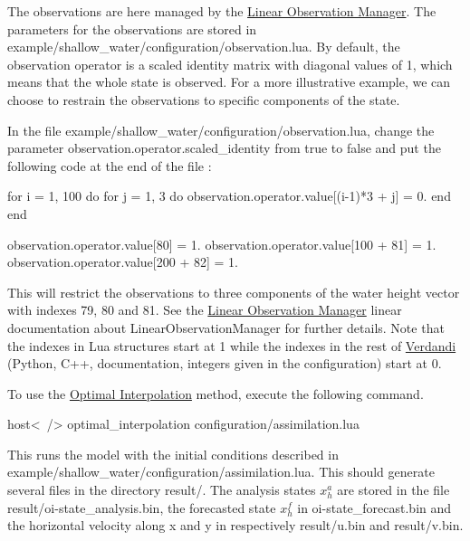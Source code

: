\documentclass{tufte-book}
\begin{document}
\-The observations are here managed by the \hyperlink{linear_observation_manager}{Linear Observation Manager}. \-The parameters for the observations are stored in {\ttfamily example/shallow\-\_\-water/configuration/observation.\-lua}. \-By default, the observation operator is a scaled identity matrix with diagonal values of 1, which means that the whole state is observed. \-For a more illustrative example, we can choose to restrain the observations to specific components of the state.

\-In the file {\ttfamily example/shallow\-\_\-water/configuration/observation.\-lua}, change the parameter {\ttfamily observation.\-operator.\-scaled\-\_\-identity} from {\ttfamily true} to {\ttfamily false} and put the following code at the end of the file \-:
\begin{frame_lua}
for i = 1, 100 do
   for j = 1, 3 do
      observation.operator.value[(i-1)*3 + j] = 0.
   end
end

observation.operator.value[80] = 1.
observation.operator.value[100 + 81] = 1.
observation.operator.value[200 + 82] = 1.
\end{frame_lua}
  \-This will restrict the observations to three components of the water height vector with indexes 79, 80 and 81. \-See the \hyperlink{linear_observation_manager}{\-Linear \-Observation \-Manager} linear documentation about \-Linear\-Observation\-Manager for further details. \-Note that the indexes in \-Lua structures start at 1 while the indexes in the rest of \hyperlink{namespace_verdandi}{\-Verdandi} (\-Python, \-C++, documentation, integers given in the configuration) start at 0.

\-To use the \hyperlink{optimal_interpolation}{\-Optimal \-Interpolation} method, execute the following command.

\begin{frame_bash}
host<~/> optimal_interpolation configuration/assimilation.lua
\end{frame_bash}

  \-This runs the model with the initial conditions described in {\ttfamily example/shallow\-\_\-water/configuration/assimilation.\-lua}. \-This should generate several files in the directory {\ttfamily result/}. \-The analysis states $x^a_h$ are stored in the file {\ttfamily result/oi-\/state\-\_\-analysis.\-bin}, the forecasted state $x^f_h$ in {\ttfamily oi-\/state\-\_\-forecast.\-bin} and the horizontal velocity along x and y in respectively {\ttfamily result/u.\-bin} and {\ttfamily result/v.\-bin}.
\end{document}
